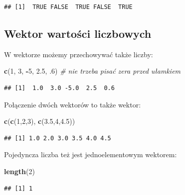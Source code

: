 \documentclass[]{book}
\newenvironment{Shaded}{\begin{snugshade}}{\end{snugshade}}
\newcommand{\KeywordTok}[1]{\textcolor[rgb]{0.13,0.29,0.53}{\textbf{#1}}}
\newcommand{\DecValTok}[1]{\textcolor[rgb]{0.00,0.00,0.81}{#1}}
\newcommand{\FloatTok}[1]{\textcolor[rgb]{0.00,0.00,0.81}{#1}}
\newcommand{\CommentTok}[1]{\textcolor[rgb]{0.56,0.35,0.01}{\textit{#1}}}
\newcommand{\OperatorTok}[1]{\textcolor[rgb]{0.81,0.36,0.00}{\textbf{#1}}}
\newcommand{\NormalTok}[1]{#1}
\begin{document}
\begin{verbatim}
## [1]  TRUE FALSE  TRUE FALSE  TRUE
\end{verbatim}

\subsection{Wektor wartości
liczbowych}\label{wektor-wartosci-liczbowych}

W wektorze możemy przechowywać także liczby:

\begin{Shaded}
\begin{Highlighting}[]
\KeywordTok{c}\NormalTok{(}\DecValTok{1}\NormalTok{, }\DecValTok{3}\NormalTok{, }\OperatorTok{-}\DecValTok{5}\NormalTok{, }\FloatTok{2.5}\NormalTok{, .}\DecValTok{6}\NormalTok{) }\CommentTok{# nie trzeba pisać zera przed ułamkiem}
\end{Highlighting}
\end{Shaded}

\begin{verbatim}
## [1]  1.0  3.0 -5.0  2.5  0.6
\end{verbatim}

Połączenie dwóch wektorów to także wektor:

\begin{Shaded}
\begin{Highlighting}[]
\KeywordTok{c}\NormalTok{(}\KeywordTok{c}\NormalTok{(}\DecValTok{1}\NormalTok{,}\DecValTok{2}\NormalTok{,}\DecValTok{3}\NormalTok{), }\KeywordTok{c}\NormalTok{(}\FloatTok{3.5}\NormalTok{,}\DecValTok{4}\NormalTok{,}\FloatTok{4.5}\NormalTok{))}
\end{Highlighting}
\end{Shaded}

\begin{verbatim}
## [1] 1.0 2.0 3.0 3.5 4.0 4.5
\end{verbatim}

Pojedyncza liczba też jest jednoelementowym wektorem:

\begin{Shaded}
\begin{Highlighting}[]
\KeywordTok{length}\NormalTok{(}\DecValTok{2}\NormalTok{)}
\end{Highlighting}
\end{Shaded}

\begin{verbatim}
## [1] 1
\end{verbatim}
\end{document}
